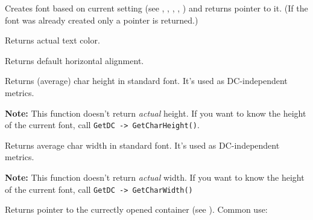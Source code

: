 \label{wxhtmlwinparsercreatecurrentfont}


Creates font based on current setting (see
,
,
,
,
)
and returns pointer to it.
(If the font was already created only a pointer is returned.)


\label{wxhtmlwinparsergetactualcolor}


Returns actual text color.

\label{wxhtmlwinparsergetalign}


Returns default horizontal alignment.

\label{wxhtmlwinparsergetcharheight}


Returns (average) char height in standard font. It's used as DC-independent metrics.

{\bf Note:} This function doesn't return {\it actual} height. If you want to
know the height of the current font, call {\tt GetDC -> GetCharHeight()}.

\label{wxhtmlwinparsergetcharwidth}


Returns average char width in standard font. It's used as DC-independent metrics.

{\bf Note:} This function doesn't return {\it actual} width. If you want to
know the height of the current font, call {\tt GetDC -> GetCharWidth()}

\label{wxhtmlwinparsergetcontainer}


Returns pointer to the currectly opened container (see ).
Common use:

